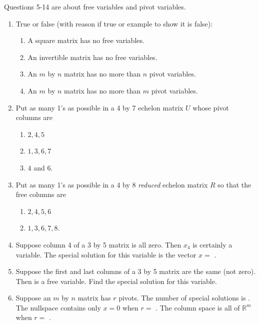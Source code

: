 \documentclass[14pt, a4paper]{article}
\begin{document}
\noindent Questions 5-14 are about free variables and pivot variables.

\begin{enumerate}[resume]
    \item True or false (with reason if true or example to show it is false):
          \begin{enumerate}
              \item A square matrix has no free variables.
              \item An invertible matrix has no free variables.
              \item An $m$ by $n$ matrix has no more than $n$ pivot variables.
              \item An $m$ by $n$ matrix has no more than $m$ pivot variables.
          \end{enumerate}

    \item Put as many 1's as possible in a 4 by 7 echelon matrix $U$ whose pivot columns are
          \begin{enumerate}
              \item $2, 4, 5$
              \item $1, 3, 6, 7$
              \item $4$ and $6$.
          \end{enumerate}

    \item Put as many 1's as possible in a 4 by 8 \textit{reduced} echelon matrix $R$ so that the free columns are
          \begin{enumerate}
              \item $2, 4, 5, 6$
              \item $1, 3, 6, 7, 8$.
          \end{enumerate}

    \item Suppose column 4 of a 3 by 5 matrix is all zero. Then $x_4$ is certainly a \underline{\hspace{2cm}} variable. The special solution for this variable is the vector $x = $ \underline{\hspace{2cm}}.

    \item Suppose the first and last columns of a 3 by 5 matrix are the same (not zero). Then \underline{\hspace{2cm}} is a free variable. Find the special solution for this variable.

    \item Suppose an $m$ by $n$ matrix has $r$ pivots. The number of special solutions is \underline{\hspace{2cm}}. The nullspace contains only $x = 0$ when $r = $ \underline{\hspace{2cm}}. The column space is all of $\mathbb{R}^m$ when $r = $ \underline{\hspace{2cm}}.


\end{enumerate}
\end{document}
